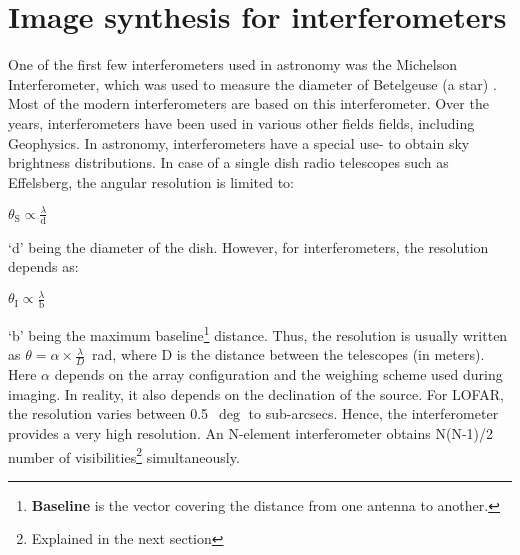 \documentclass[../main/thesis_msc.tex]{subfiles}
\begin{document}
\section{Image synthesis for interferometers}
\label{sec:resolu}
One of the first few interferometers used in astronomy was the Michelson Interferometer, which was used to measure the diameter of Betelgeuse (a star) \citep{1921ApJ....53..249M}. Most of the modern interferometers are based on this interferometer. Over the years, interferometers have been used in various other fields fields, including Geophysics. In astronomy, interferometers have a special use- to obtain sky brightness distributions. In case of a single dish radio telescopes such as Effelsberg, the angular resolution is limited to:
\begin{center}
 $\theta_{\textrm{S}} \propto \frac{\lambda}{\textrm{d}}$
\end{center}
`d' being the diameter of the dish.  However, for interferometers, the resolution depends as:
\begin{center}
 $\theta_{\textrm{I}} \propto \frac{\lambda}{\textrm{b}}$
\end{center}
`b' being the maximum baseline\footnote{\textbf{Baseline} is the vector covering the distance from one antenna to another.} distance. Thus, the resolution is usually written as $\theta = \alpha\times \frac{\lambda}{D}$~rad, where D is the distance between the telescopes (in meters). Here $\alpha$ depends on the array configuration and the weighing scheme used during imaging. In reality, it also depends on the declination of the source. For LOFAR, the resolution varies between 0.5~$\deg$ to sub-arcsecs. Hence, the interferometer provides a very high resolution. An N-element interferometer obtains N(N-1)/2 number of visibilities\footnote{Explained in the next section} simultaneously. 
\end{document}
